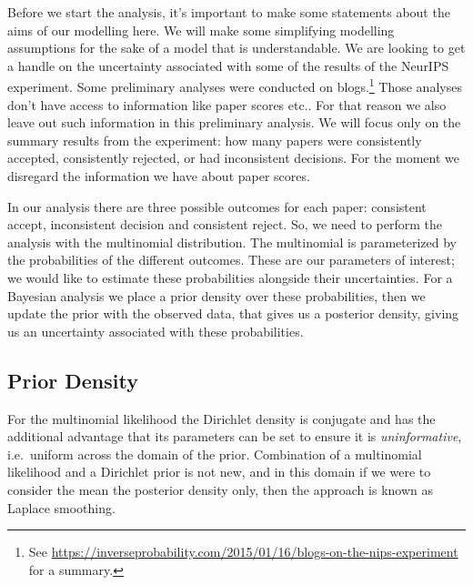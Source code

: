 Before we start the analysis, it's important to make some statements
about the aims of our modelling here. We will make some simplifying
modelling assumptions for the sake of a model that is understandable. We
are looking to get a handle on the uncertainty associated with some of
the results of the NeurIPS experiment.
Some
preliminary analyses were conducted on blogs.\footnote{See \url{https://inverseprobability.com/2015/01/16/blogs-on-the-nips-experiment} for a summary.} Those
analyses don't have access to information like paper scores etc.. For
that reason we also leave out such information in this preliminary
analysis. We will focus only on the summary results from the experiment:
how many papers were consistently accepted, consistently rejected, or
had inconsistent decisions. For the moment we disregard the information
we have about paper scores.

In our analysis there are three possible outcomes for each paper:
consistent accept, inconsistent decision and consistent reject. So, we
need to perform the analysis with the
multinomial
distribution. The multinomial is parameterized by the probabilities of
the different outcomes. These are our parameters of interest; we would
like to estimate these probabilities alongside their uncertainties. For 
a Bayesian analysis we place a prior density over these
probabilities, then we update the prior with the observed data, that
gives us a posterior density, giving us an uncertainty associated with
these probabilities.

\subsection{Prior Density}\label{prior-density}

For the multinomial likelihood the Dirichlet
density is
conjugate and has
the additional advantage that its parameters can be set to ensure it is
\emph{uninformative}, i.e.~uniform across the domain of the prior.
Combination of a multinomial likelihood and a Dirichlet prior is not
new, and in this domain if we were to consider the mean the posterior
density only, then the approach is known as
Laplace
smoothing.

